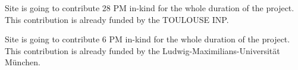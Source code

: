 Site  is going to contribute 28 PM in-kind for the whole duration of the project.
This contribution is already funded by the TOULOUSE INP.

Site  is going to contribute 6 PM in-kind for the whole duration of the project.
This contribution is already funded by the Ludwig-Maximilians-Universit\"at M\"unchen.


